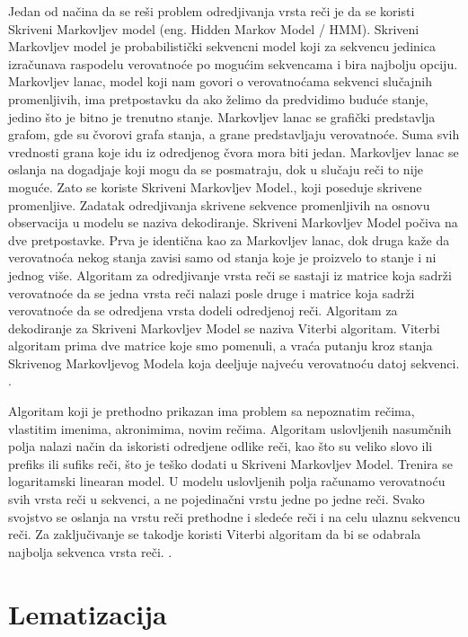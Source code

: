 \documentclass[12pt,oneside]{memoir}
\begin{document}
Jedan od načina da se reši problem odredjivanja vrsta reči je da se koristi Skriveni Markovljev model (eng. Hidden Markov Model / HMM). Skriveni Markovljev model je probabilistički sekvencni model koji za sekvencu jedinica izračunava raspodelu verovatnoće po mogućim sekvencama i bira najbolju opciju.  Markovljev lanac,  model koji nam govori o verovatnoćama sekvenci slučajnih promenljivih,  ima pretpostavku da ako želimo da predvidimo buduće stanje,  jedino što je bitno je trenutno stanje.  Markovljev lanac se grafički predstavlja grafom, gde su čvorovi grafa stanja, a grane predstavljaju verovatnoće.  Suma svih vrednosti grana koje idu iz odredjenog čvora mora biti jedan.  Markovljev lanac se oslanja na dogadjaje koji mogu da se posmatraju,  dok u slučaju reči to nije moguće.  Zato se koriste Skriveni Markovljev Model., koji poseduje skrivene promenljive.  Zadatak odredjivanja skrivene sekvence promenljivih na osnovu observacija u modelu se naziva dekodiranje.  Skriveni Markovljev Model počiva na dve pretpostavke.  Prva je identična kao za Markovljev lanac, dok druga kaže da verovatnoća nekog stanja zavisi samo od stanja koje je proizvelo to stanje i ni jednog više.  Algoritam za odredjivanje vrsta reči se sastaji iz matrice koja sadrži verovatnoće da se jedna vrsta reči nalazi posle druge i matrice koja sadrži verovatnoće da se odredjena vrsta dodeli odredjenoj reči.  Algoritam za dekodiranje za Skriveni Markovljev Model se naziva Viterbi algoritam.  Viterbi algoritam prima dve matrice koje smo pomenuli, a vraća putanju kroz stanja Skrivenog Markovljevog Modela koja deeljuje najveću verovatnoću datoj sekvenci.  \cite{pos_tagging}.

Algoritam koji je prethodno prikazan ima problem sa nepoznatim rečima,  vlastitim imenima,  akronimima,  novim rečima.  Algoritam uslovljenih nasumčnih polja nalazi način da iskoristi odredjene odlike reči,  kao što su veliko slovo ili prefiks ili sufiks reči,  što je teško dodati u Skriveni Markovljev Model.  Trenira se logaritamski linearan model.  U modelu uslovljenih polja računamo verovatnoću svih vrsta reči u sekvenci,  a ne pojedinačni vrstu jedne po jedne reči.  Svako svojstvo se oslanja na vrstu reči prethodne i sledeće reči i na celu ulaznu sekvencu reči.  Za zaključivanje se takodje koristi Viterbi algoritam da bi se odabrala najbolja sekvenca vrsta reči.  \cite{pos_tagging}.

\section{Lematizacija}
\end{document}
